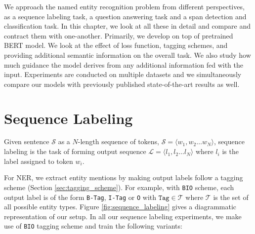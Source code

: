 We approach the named entity recognition problem from different perspectives, as a sequence labeling task, a question answering task and a span detection and classification task. In this chapter, we look at all these in detail and compare and contract them with one-another. Primarily, we develop on top of pretrained BERT model. We look at the effect of loss function, tagging schemes, and providing additional semantic information on the overall task. We also study how much guidance the model derives from any additional information fed with the input. Experiments are conducted on multiple datasets and we simultaneously compare our models with previously published state-of-the-art results as well. 

\section{Sequence Labeling}
\begin{definition}
\label{def:seq_labeling}
    Given sentence $\mathcal{S}$ as a $N$-length sequence of tokens, $\mathcal{S} = \langle w_1, w_2 \ldots w_N \rangle$, sequence labeling is the task of forming output sequence $\mathcal{L} = \langle l_1, l_2 \ldots l_N \rangle$ where $l_i$ is the label assigned to token $w_i$. 
\end{definition}

For NER, we extract entity mentions by making output labels follow a tagging scheme (Section \ref{sec:tagging_scheme}). For example, with \texttt{BIO} scheme, each output label is of the form \texttt{B-Tag}, \texttt{I-Tag} or \texttt{O} with $\texttt{Tag} \in \mathcal{T}$ where $\mathcal{T}$ is the set of all possible entity types. Figure \ref{fig:sequence_labeling} gives a diagrammatic representation of our setup. In all our sequence labeling experiments, we make use of \texttt{BIO} tagging scheme and train the following variants:

